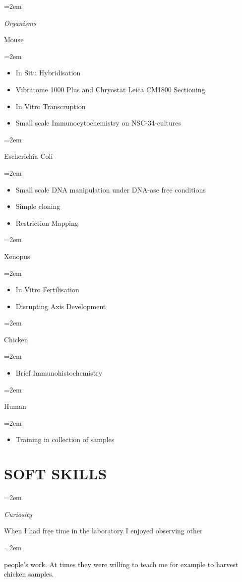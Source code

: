 \documentclass[paper=a4,fontsize=11pt]{scrartcl} %
\newlength{\spacebox}
\newcommand{\sepspace}{\vspace*{1em}}		%
\newcommand{\NewPart}[1]{\section*{\uppercase{#1}}}
\newcommand{\PersonalEntry}[2]{
		\noindent\hangindent=2em\hangafter=0 %
		\parbox{\spacebox}{        %
		\textit{#1}}		       %
		\hspace{1.5em} #2 \par}    %
\newcommand{\SkillsEntry}[2]{      %
		\noindent\hangindent=2em\hangafter=0 %
		\parbox{\spacebox}{        %
		\textit{#1}}			   %
		\hspace{1.5em} \parbox{6\spacebox}{#2} \par}    %
\begin{document}
  \SkillsEntry{Organisms}{Mouse}
  \SkillsEntry{}{\begin{itemize}[noitemsep,topsep=0pt]
      \item In Situ Hybridisation
      \item Vibratome 1000 Plus and Chryostat Leica CM1800 Sectioning
      \item In Vitro Transcruption
      \item Small scale Immunocytochemistry on NSC-34-cultures
    \end{itemize}}
    \vspace{3pt}
  \SkillsEntry{}{Escherichia Coli}
  \SkillsEntry{}{\begin{itemize}[noitemsep,topsep=0pt]
      \item Small scale DNA manipulation under DNA-ase free conditions
      \item Simple cloning %
      \item Restriction Mapping
    \end{itemize}}
    \vspace{3pt}
  \SkillsEntry{}{Xenopus}
  \SkillsEntry{}{\begin{itemize}[noitemsep,topsep=0pt]
      \item In Vitro Fertilisation
      \item Disrupting Axis Development
    \end{itemize}}
    \vspace{3pt}
  \SkillsEntry{}{Chicken}
  \SkillsEntry{}{\begin{itemize}[noitemsep,topsep=0pt]
        \item Brief Immunohistochemistry
    \end{itemize}}
    \vspace{3pt}
  \SkillsEntry{}{Human}
  \SkillsEntry{}{\begin{itemize}[noitemsep,topsep=0pt]
      \item Training in collection of samples
    \end{itemize}}
  \sepspace

  \clearpage
  \NewPart{Soft Skills}{}
  
  \SkillsEntry{Curiosity}{When I had free time in the laboratory I enjoyed
  observing other}
  \vspace{3pt}
  \SkillsEntry{}{people's work.  At times they were willing to teach me for
  example to harvest chicken samples.}
  \sepspace
\end{document}
